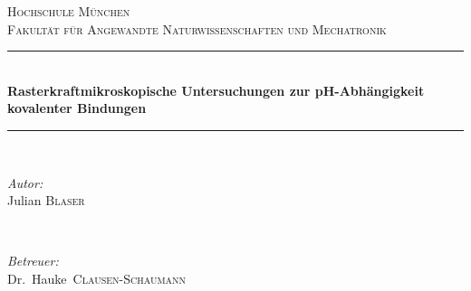 \begin{titlepage}

\newcommand{\HRule}{\rule{\linewidth}{0.5mm}} %

\center %
 

\textsc{\LARGE Hochschule München}\\[1.5cm] %
\textsc{\Large Fakultät für Angewandte Naturwissenschaften und Mechatronik}\\[0.5cm] %

\begin{spacing}{2}
\HRule \\[0.4cm]
{ \huge \bfseries Rasterkraftmikroskopische Untersuchungen zur pH-Abhängigkeit kovalenter Bindungen}\\[0.4cm] %
\HRule \\[1.5cm]
 \end{spacing}

\begin{minipage}{0.45\textwidth}
\begin{flushleft} \large
\emph{Autor:}\\
Julian \textsc{Blaser} %
\end{flushleft}
\end{minipage}
~
\begin{minipage}{0.45\textwidth}
\begin{flushright} \large
\emph{Betreuer:} \\
Dr.~Hauke~\textsc{Clausen-Schaumann} \\ %
\end{flushright}
\end{minipage}\\[3,5cm]


\end{titlepage}

